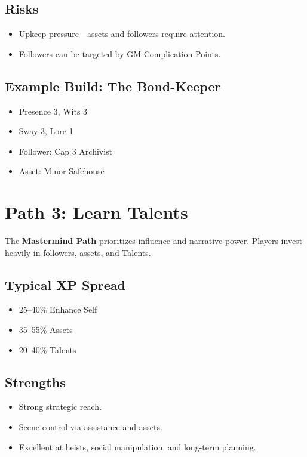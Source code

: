 \subsection*{Risks}
\begin{itemize}
  \item Upkeep pressure—assets and followers require attention.
  \item Followers can be targeted by GM Complication Points.
\end{itemize}

\subsection*{Example Build: The Bond-Keeper}
\begin{itemize}
  \item Presence 3, Wits 3
  \item Sway 3, Lore 1
  \item Follower: Cap 3 Archivist
  \item Asset: Minor Safehouse
\end{itemize}

\section{Path 3: Learn Talents}

The \textbf{Mastermind Path} prioritizes influence and narrative power. Players invest heavily in followers, assets, and Talents.

\subsection*{Typical XP Spread}
\begin{itemize}
  \item 25–40\% Enhance Self
  \item 35–55\% Assets
  \item 20–40\% Talents
\end{itemize}

\subsection*{Strengths}
\begin{itemize}
  \item Strong strategic reach.
  \item Scene control via assistance and assets.
  \item Excellent at heists, social manipulation, and long-term planning.
\end{itemize}

